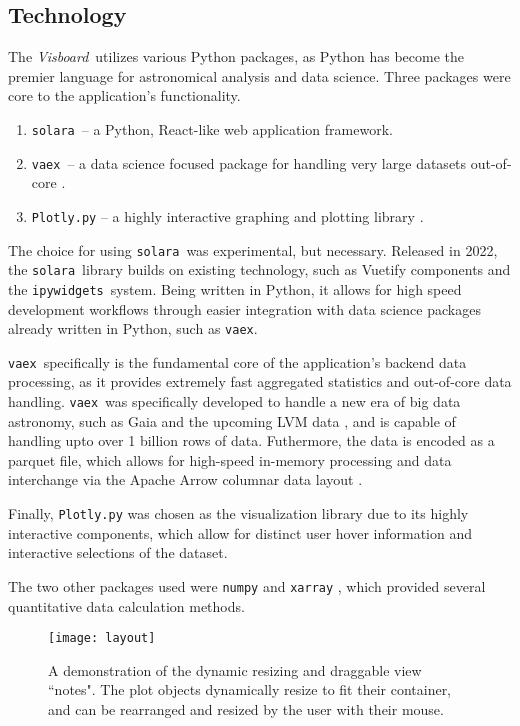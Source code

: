 \documentclass[a4paper,10pt,twocolumn]{article}
\newcommand{\solara}{\texttt{solara}}
\newcommand{\vaex}{\texttt{vaex}}
\newcommand{\visboard}{\emph{Visboard}}
\begin{document}
\subsection{Technology}
\label{sec:tech}
The \visboard\, utilizes various Python packages, as Python has become the premier language for astronomical analysis and data science. Three packages were core to the application's functionality.

\begin{enumerate}
	\item \solara\, -- a Python, React-like web application framework.
	\item \vaex\, -- a data science focused package for handling very large datasets out-of-core \parencite{vaex}.
	\item \texttt{Plotly.py} -- a highly interactive graphing and plotting library \parencite{plotly}.
\end{enumerate}

The choice for using \solara\, was experimental, but necessary. Released in 2022, the \solara\, library builds on existing technology, such as Vuetify components and the \texttt{ipywidgets}\, system. Being written in Python, it allows for high speed development workflows through easier integration with data science packages already written in Python, such as \vaex.

\vaex\, specifically is the fundamental core of the application's backend data processing, as it provides extremely fast aggregated statistics and out-of-core data handling. \vaex\, was specifically developed to handle a new era of big data astronomy, such as Gaia and the upcoming LVM data \parencite{vaex}, and is capable of handling upto over 1 billion rows of data. Futhermore, the data is encoded as a parquet file, which allows for high-speed in-memory processing and data interchange via the Apache Arrow columnar data layout \parencite{parquet}.

Finally, \texttt{Plotly.py} was chosen as the visualization library due to its highly interactive components, which allow for distinct user hover information and interactive selections of the dataset.

The two other packages used were \texttt{numpy} \parencite{numpy} and \texttt{xarray} \parencite{xarray}, which provided several quantitative data calculation methods.

\begin{figure}[tp]
	\centering
	\texttt{[image: layout]}
	\caption{A demonstration of the dynamic resizing and draggable view ``notes". The plot objects dynamically resize to fit their container, and can be rearranged and resized by the user with their mouse.}
	\label{fig:layout}
\end{figure}
\end{document}

